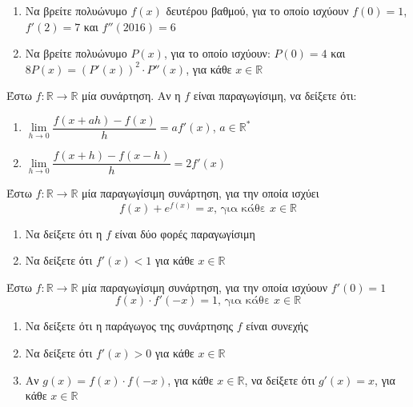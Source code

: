\documentclass{presentation}
\begin{document}
\begin{askisi}
  \begin{enumerate}
    \item<1->  Να βρείτε πολυώνυμο $f(x)$ δευτέρου βαθμού, για το οποίο ισχύουν $f(0)=1$, $f'(2)=7$ και $f''(2016)=6$
    \item<2-> Να βρείτε πολυώνυμο $P(x)$, για το οποίο ισχύουν: $P(0)=4$ και $8P(x)=\left( P'(x)\right)^2\cdot P''(x)  $, για κάθε $x\in\mathbb{R}$
  \end{enumerate}

\end{askisi}

\begin{askisi}
  Έστω $f:\mathbb{R}\to\mathbb{R}$ μία συνάρτηση. Αν η $f$ είναι παραγωγίσιμη, να δείξετε ότι:
  \begin{enumerate}
    \item<1-> $\lim\limits_{h \to 0}{ \dfrac{f(x+ah)-f(x)}{h} }=af'(x)$, $a\in\mathbb{R}^*$
    \item<2-> $\lim\limits_{h \to 0}{ \dfrac{f(x+h)-f(x-h)}{h} }=2f'(x)$
  \end{enumerate}

\end{askisi}

\begin{askisi}
  Έστω $f:\mathbb{R}\to\mathbb{R}$ μία παραγωγίσιμη συνάρτηση, για την οποία ισχύει
  $$f(x)+e^{f(x)}=x \text{, για κάθε } x\in\mathbb{R}$$
  \begin{enumerate}
    \item<1-> Να δείξετε ότι η $f$ είναι δύο φορές παραγωγίσιμη
    \item<2-> Να δείξετε ότι $f'(x)<1$ για κάθε $x\in\mathbb{R}$
  \end{enumerate}

\end{askisi}

\begin{askisi}
  Έστω $f:\mathbb{R}\to\mathbb{R}$ μία παραγωγίσιμη συνάρτηση, για την οποία ισχύουν $f'(0)=1$
  $$f(x)\cdot f'(-x)=1 \text{, για κάθε } x\in\mathbb{R}$$
  \begin{enumerate}
    \item<1-> Να δείξετε ότι η παράγωγος της συνάρτησης $f$ είναι συνεχής
    \item<2-> Να δείξετε ότι $f'(x)>0$ για κάθε $x\in\mathbb{R}$
    \item<3-> Αν $g(x)=f(x)\cdot f(-x)$, για κάθε $x\in\mathbb{R}$, να δείξετε ότι $g'(x)=x$, για κάθε $x\in\mathbb{R}$
  \end{enumerate}

\end{askisi}
\end{document}
